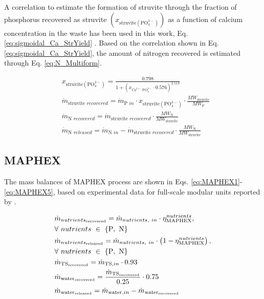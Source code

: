 \begin{refsection}[referencesApD]
A correlation
to estimate the formation of struvite through the fraction of phosphorus recovered as struvite $\left(x_{\text{struvite} \left(\text{PO}_{4}^{3-}\right) }\right) $ as a function of calcium concentration in the waste has been used in this work, Eq. \ref{eq:sigmoidal_Ca_StrYield} \citep{martin2020model}.
Based on the correlation shown in Eq. \ref{eq:sigmoidal_Ca_StrYield}, the amount of nitrogen recovered is estimated through Eq. \ref{eq:N_Multiform}.

\begin{align}
& x_{\text{struvite} \left(\text{PO}_{4}^{3-}\right) }= \frac{0.798}{1+\left(x_{\text{Ca}^{2+}:\text{PO}_{4}^{3-}} \cdot 0.576\right)^{2.113}} \label{eq:sigmoidal_Ca_StrYield}
\\
& \dot{m}_{\text{struvite } recovered} = \dot{m}_{\text{P } in}  \cdot x_{\text{struvite} \left(\text{PO}_{4}^{3-}\right) } \cdot \frac{MW_{\text{struvite}}}{MW_{\text{P}}}
\\
& \dot{m}_{\text{N } recovered} =  \dot{m}_{\text{struvite } recovered} \cdot \frac{MW_{\text{N}}}{MW_{\text{struvite}}} \label{eq:N_Multiform}
\\ 
& \dot{m}_{\text{N } released} = \dot{m}_{\text{N } in} - \dot{m}_{\text{struvite } recovered} \cdot \frac{MW_{\text{N}}}{MW_{\text{struvite}}}
\end{align} 

\subsection{MAPHEX}
The mass balances of MAPHEX process are shown in Eqs. \ref{eq:MAPHEX1}-\ref{eq:MAPHEX5}, based on experimental data for full-scale modular units reported by \citet{church_versatility2018}.

\begin{align}
& \dot{m}_{nutrients_\text{recovered}} = \dot{m}_{nutrients, \ in} \cdot \eta_{\text{MAPHEX}}^{{nutrients}}, \label{eq:MAPHEX1} \\
& \forall \ nutrients \ \in \ \{\text{P}, \ \text{N}\} \nonumber
\\
& \dot{m}_{nutrients_\text{released}} = \dot{m}_{nutrients, \ in} \cdot \left(1- \eta_{\text{MAPHEX}}^{{nutrients}}\right), \label{eq:MAPHEX2} \\
& \forall \ nutrients \ \in \ \{\text{P}, \ \text{N}\}  \nonumber
\\
& \dot{m}_{\text{TS\textsubscript{recovered}}} = \dot{m}_{\text{TS}, in} \cdot 0.93 \label{eq:MAPHEX3}
\\
& \dot{m}_{\text{water\textsubscript{recovered}}} = \frac{\dot{m}_{\text{TS\textsubscript{recovered}}}}{0.25} \cdot 0.75 \label{eq:MAPHEX4}
\\
& \dot{m}_{\text{water\textsubscript{released}}} = \dot{m}_{\text{water}, in} - \dot{m}_{\text{water\textsubscript{recovered}}} \label{eq:MAPHEX5}
\end{align}


\end{refsection}

